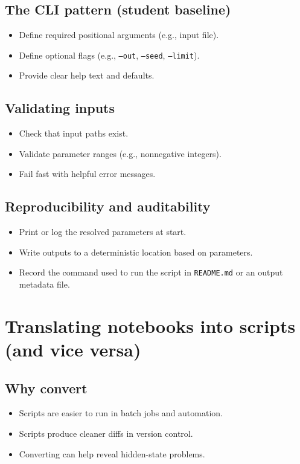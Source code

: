 \subsection{The CLI pattern (student baseline)}
\begin{itemize}
\item Define required positional arguments (e.g., input file).
\item Define optional flags (e.g., \texttt{--out}, \texttt{--seed}, \texttt{--limit}).
\item Provide clear help text and defaults.
\end{itemize}

\subsection{Validating inputs}
\begin{itemize}
\item Check that input paths exist.
\item Validate parameter ranges (e.g., nonnegative integers).
\item Fail fast with helpful error messages.
\end{itemize}

\subsection{Reproducibility and auditability}
\begin{itemize}
\item Print or log the resolved parameters at start.
\item Write outputs to a deterministic location based on parameters.
\item Record the command used to run the script in \texttt{README.md} or an output metadata file.
\end{itemize}

\section{Translating notebooks into scripts (and vice versa)}
\subsection{Why convert}
\begin{itemize}
\item Scripts are easier to run in batch jobs and automation.
\item Scripts produce cleaner diffs in version control.
\item Converting can help reveal hidden-state problems.
\end{itemize}

